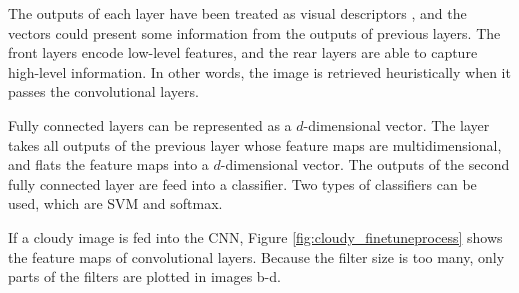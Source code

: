 The outputs of each layer have been treated as visual descriptors \citep{razavian2014cnn}, and the vectors could present some information from the outputs of previous layers. The front layers encode low-level features, and the rear layers are able to capture high-level information. In other words, the image is retrieved heuristically when it passes the convolutional layers.

Fully connected layers can be represented as a $d$-dimensional vector. The layer takes all outputs of the previous layer  whose feature maps are multidimensional, and flats the feature maps into a $d$-dimensional vector. The outputs of the second fully connected layer are feed into a classifier. Two types of classifiers can be used, which are SVM and softmax.

If a cloudy image is fed into the CNN, Figure \ref{fig:cloudy_finetuneprocess} shows the feature maps of convolutional layers. Because the filter size is too many, only parts of the filters are plotted in images b-d.

\graphicspath{ {./Figures/DifferentLayers/} }

